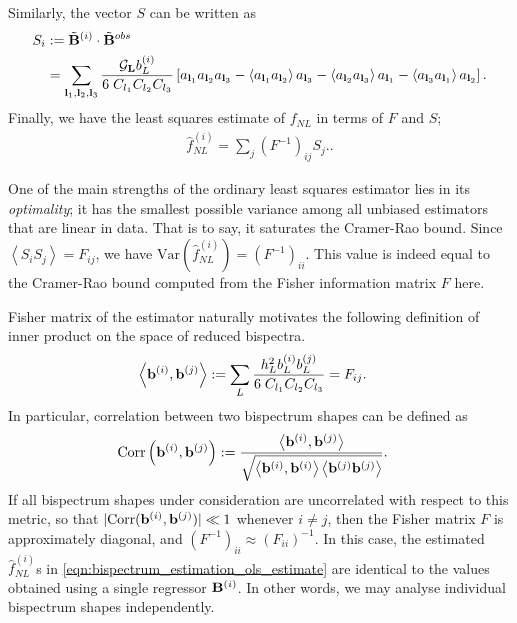 Similarly, the vector $S$ can be written as
\begin{align}
	S_i &:= \tilde{\mathbf{B}}^{(i)} \cdot \tilde{\mathbf{B}}^{obs} \\
	&= \sum_{\mathbf{l}_1 , \mathbf{l}_2 , \mathbf{l}_3} \frac{\mathcal{G}_{\mathbf{L}} b^{(i)}_{L}}{6 \; C_{l_1} C_{l_2} C_{l_3}} \left[ a_{\mathbf{l}_1} a_{\mathbf{l}_2} a_{\mathbf{l}_3} - \left< a_{\mathbf{l}_1} a_{\mathbf{l}_2} \right> a_{\mathbf{l}_3} - \left< a_{\mathbf{l}_2} a_{\mathbf{l}_3} \right> a_{\mathbf{l}_1} - \left< a_{\mathbf{l}_3} a_{\mathbf{l}_1} \right> a_{\mathbf{l}_2} \right].
	\label{eqn:bispectrum_estimation_signal}
\end{align}
Finally, we have the least squares estimate of $f_{NL}$ in terms of $F$ and $S$;
\begin{align}
	\hat{f}_{NL}^{(i)} = \sum_j (F^{-1})_{ij} S_j. \label{eqn:bispectrum_estimation_ols_estimate}.
\end{align}

One of the main strengths of the ordinary least squares estimator lies in its \textit{optimality}; it has the smallest possible variance among all unbiased estimators that are linear in data. That is to say, it saturates the Cramer-Rao bound. Since $\left< S_i S_j \right> = F_{ij}$, we have $\text{Var}(\hat{f}_{NL}^{(i)}) = (F^{-1})_{ii}$. This value is indeed equal to the Cramer-Rao bound computed from the Fisher information matrix $F$ here.

Fisher matrix of the estimator naturally motivates the following definition of inner product on the space of reduced bispectra.
\begin{align}
	\left< \mathbf{b}^{(i)}, \mathbf{b}^{(j)} \right> &:= \sum_L \frac{h^2_L b^{(i)}_L b^{(j)}_L}{6 \; C_{l_1} C_{l_2} C_{l_3}}  = F_{ij}.	\label{def:bispectrum_estimation_fisher_inner_product}
\end{align}
In particular, correlation between two bispectrum shapes can be defined as
\begin{align}
	\text{Corr} \left( \mathbf{b}^{(i)}, \mathbf{b}^{(j)} \right) &:= \frac{ \left< \mathbf{b}^{(i)}, \mathbf{b}^{(j)} \right>}{\sqrt{ \left< \mathbf{b}^{(i)}, \mathbf{b}^{(i)} \right> \left< \mathbf{b}^{(j)} \mathbf{b}^{(j)} \right> }}.
\end{align}
If all bispectrum shapes under consideration are uncorrelated with respect to this metric, so that $| \text{Corr}(\mathbf{b}^{(i)}, \mathbf{b}^{(j)}) | \ll 1$ whenever $i \neq j$, then the Fisher matrix $F$ is approximately diagonal, and $(F^{-1})_{ii} \approx (F_{ii})^{-1}$. In this case, the estimated $\hat{f}_{NL}^{(i)}$s in \eqref{eqn:bispectrum_estimation_ols_estimate} are identical to the values obtained using a single regressor $\mathbf{B}^{(i)}$. In other words, we may analyse individual bispectrum shapes independently.

